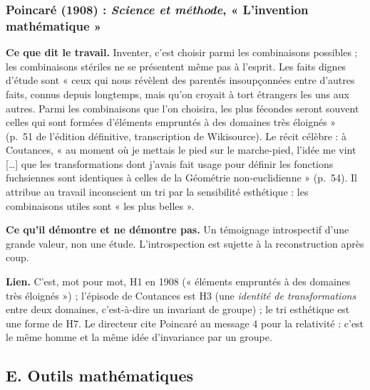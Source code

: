 \documentclass[a4paper,11pt]{article}
\newcommand{\cours}[1]{\par\smallskip\textbf{\textsf{#1}}\enspace}
\begin{document}
\subsubsection{Poincaré (1908) : \emph{Science et méthode}, « L'invention mathématique »}
\cours{Ce que dit le travail.} Inventer, c'est choisir parmi les combinaisons possibles ; les combinaisons stériles ne se présentent même pas à l'esprit. Les faits dignes d'étude sont « ceux qui nous révèlent des parentés insoupçonnées entre d'autres faits, connus depuis longtemps, mais qu'on croyait à tort étrangers les uns aux autres. Parmi les combinaisons que l'on choisira, les plus fécondes seront souvent celles qui sont formées d'éléments empruntés à des domaines très éloignés » (p.~51 de l'édition définitive, transcription de Wikisource). Le récit célèbre : à Coutances, « au moment où je mettais le pied sur le marche-pied, l'idée me vint […] que les transformations dont j'avais fait usage pour définir les fonctions fuchsiennes sont identiques à celles de la Géométrie non-euclidienne » (p.~54). Il attribue au travail inconscient un tri par la sensibilité esthétique : les combinaisons utiles sont « les plus belles ».
\cours{Ce qu'il démontre et ne démontre pas.} Un témoignage introspectif d'une grande valeur, non une étude. L'introspection est sujette à la reconstruction après coup.
\cours{Lien.} C'est, mot pour mot, H1 en 1908 (« éléments empruntés à des domaines très éloignés ») ; l'épisode de Coutances est H3 (une \emph{identité de transformations} entre deux domaines, c'est-à-dire un invariant de groupe) ; le tri esthétique est une forme de H7. Le directeur cite Poincaré au message 4 pour la relativité : c'est le même homme et la même idée d'invariance par un groupe.

\subsection*{E. Outils mathématiques}
\end{document}

